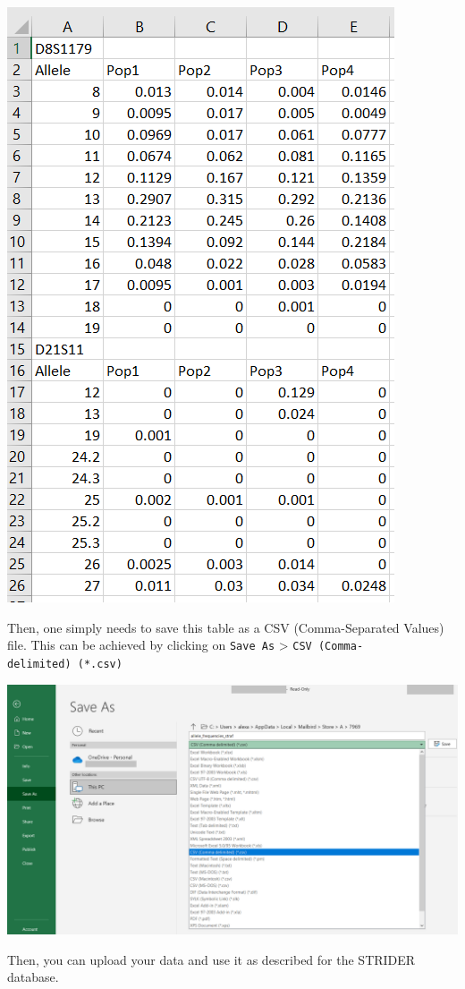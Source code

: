 \documentclass[
]{book}
\begin{document}
\includegraphics[width=0.8\linewidth]{img/capture_ref_excel_1}

Then, one simply needs to save this table as a CSV (Comma-Separated Values) file. This can be
achieved by clicking on \texttt{Save\ As} \textgreater{} \texttt{CSV\ (Comma-delimited)\ (*.csv)}

\includegraphics[width=0.8\linewidth]{img/capture_ref_excel_2}

Then, you can upload your data and use it as described for the STRIDER database.
\end{document}
